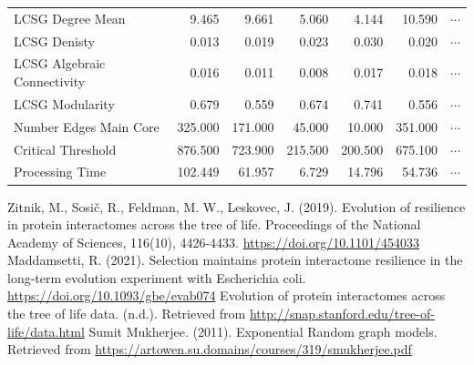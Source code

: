 \documentclass[12pt]{article}
\begin{document}
\begin{table}[H]
\begin{tabular}{lrrrrrr}
LCSG Degree Mean            &      9.465 &      9.661 &    5.060 &    4.144 &     10.590 & $\cdots$\\
LCSG Denisty                &      0.013 &      0.019 &    0.023 &    0.030 &      0.020 & $\cdots$\\
LCSG Algebraic Connectivity &      0.016 &      0.011 &    0.008 &    0.017 &      0.018 & $\cdots$\\
LCSG Modularity             &      0.679 &      0.559 &    0.674 &    0.741 &      0.556 & $\cdots$\\
Number Edges Main Core      &    325.000 &    171.000 &   45.000 &   10.000 &    351.000 & $\cdots$\\
Critical Threshold          &    876.500 &    723.900 &  215.500 &  200.500 &    675.100 & $\cdots$\\
Processing Time             &    102.449 &     61.957 &    6.729 &   14.796 &     54.736 & $\cdots$\\
\bottomrule
\end{tabular}
\end{table} \newpage
\begin{thebibliography}{1}
  Zitnik, M., Sosič, R., Feldman, M. W., Leskovec, J. (2019). Evolution of resilience in protein interactomes across the tree of life. Proceedings of the National Academy of Sciences, 116(10), 4426-4433. \url{https://doi.org/10.1101/454033}
 Maddamsetti, R. (2021). Selection maintains protein interactome resilience in the long-term evolution experiment with Escherichia coli. \url{https://doi.org/10.1093/gbe/evab074}
 Evolution of protein interactomes across the tree of life data. (n.d.). Retrieved from \url{http://snap.stanford.edu/tree-of-life/data.html}
 Sumit Mukherjee. (2011). Exponential Random graph models. Retrieved from \url{https://artowen.su.domains/courses/319/smukherjee.pdf}
  \end{thebibliography}

\end{document}
